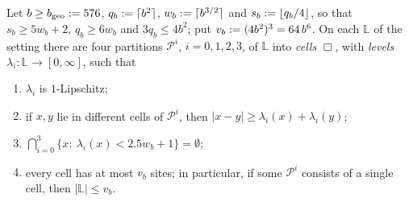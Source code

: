 
\begin{lemma}[pavements]\label{rot:lem:R1geo}
Let $b\ge b_{\mathrm{geo}}:=576$, $q_b:=\lceil b^2\rceil$, $w_b:=\lceil b^{3/2}\rceil$ and $s_b:=\lfloor q_b/4\rfloor$, so that $s_b\ge5w_b+2$, $q_b\ge6w_b$ and $3q_b\le4b^2$; put $v_b:=(4b^2)^3=64\,b^6$. On each $\mathbb{L}$ of the setting there are four partitions $\mathcal P^i$, $i=0,1,2,3$, of $\mathbb{L}$ into \emph{cells} $\Box$, with \emph{levels} $\lambda_i:\mathbb{L}\to[0,\infty]$, such that
\begin{enumerate}[label=\textup{(G\arabic*)},leftmargin=*]
\item $\lambda_i$ is $1$-Lipschitz;
\item if $x,y$ lie in different cells of $\mathcal P^i$, then $|x-y|\ge\lambda_i(x)+\lambda_i(y)$;
\item $\bigcap_{i=0}^3\{x:\ \lambda_i(x)<2.5w_b+1\}=\emptyset$;
\item every cell has at most $v_b$ sites; in particular, if some $\mathcal P^i$ consists of a single cell, then $|\mathbb{L}|\le v_b$.
\end{enumerate}
\end{lemma}
